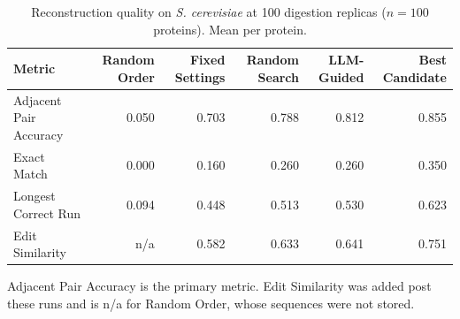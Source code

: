 \begin{table}[!tb]
  \centering
  \caption{Reconstruction quality on \textnormal{\textnormal{\textit{S. cerevisiae}}} at 100 digestion replicas ($n=100$ proteins). Mean per protein.}
  \label{tab:main_results_yeast_r100}
  \begin{tabular}{lrrrrr}
    \toprule
    Metric & Random Order & Fixed Settings & Random Search & LLM-Guided & Best Candidate \\
    \midrule
    Adjacent Pair Accuracy & 0.050 & 0.703 & 0.788 & 0.812 & 0.855 \\
    Exact Match & 0.000 & 0.160 & 0.260 & 0.260 & 0.350 \\
    Longest Correct Run & 0.094 & 0.448 & 0.513 & 0.530 & 0.623 \\
    Edit Similarity & n/a & 0.582 & 0.633 & 0.641 & 0.751 \\
    \bottomrule
  \end{tabular}
  \par\smallskip\footnotesize{Adjacent Pair Accuracy is the primary metric. Edit Similarity was added post these runs and is n/a for Random Order, whose sequences were not stored.}
\end{table}

